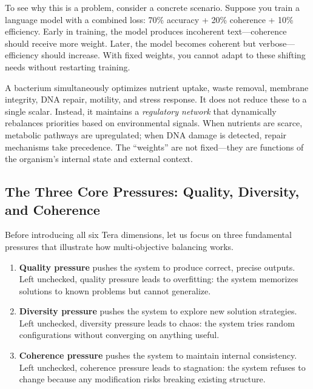 To see why this is a problem, consider a concrete scenario. Suppose you train a language model with a combined loss: 70\% accuracy + 20\% coherence + 10\% efficiency. Early in training, the model produces incoherent text---coherence should receive more weight. Later, the model becomes coherent but verbose---efficiency should increase. With fixed weights, you cannot adapt to these shifting needs without restarting training.

\begin{bioinsight}
A bacterium simultaneously optimizes nutrient uptake, waste removal, membrane integrity, DNA repair, motility, and stress response. It does not reduce these to a single scalar. Instead, it maintains a \emph{regulatory network} that dynamically rebalances priorities based on environmental signals. When nutrients are scarce, metabolic pathways are upregulated; when DNA damage is detected, repair mechanisms take precedence. The ``weights'' are not fixed---they are functions of the organism's internal state and external context.
\end{bioinsight}

\subsection{The Three Core Pressures: Quality, Diversity, and Coherence}

Before introducing all six Tera dimensions, let us focus on three fundamental pressures that illustrate how multi-objective balancing works.

\begin{enumerate}[leftmargin=1.8em]
  \item \textbf{Quality pressure} pushes the system to produce correct, precise outputs. Left unchecked, quality pressure leads to overfitting: the system memorizes solutions to known problems but cannot generalize.

  \item \textbf{Diversity pressure} pushes the system to explore new solution strategies. Left unchecked, diversity pressure leads to chaos: the system tries random configurations without converging on anything useful.

  \item \textbf{Coherence pressure} pushes the system to maintain internal consistency. Left unchecked, coherence pressure leads to stagnation: the system refuses to change because any modification risks breaking existing structure.
\end{enumerate}

